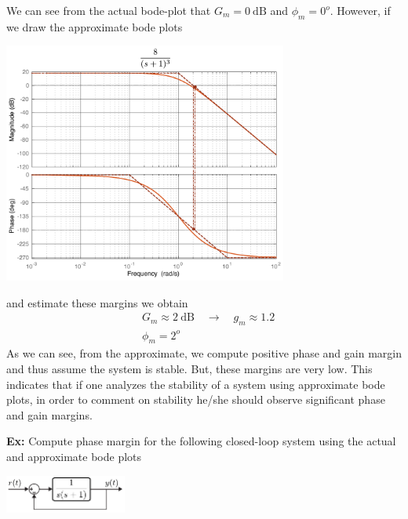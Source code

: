 \documentclass[twoside]{article}
\begin{document}
We can see from the actual bode-plot that  $G_m =  0 \ \mathrm{dB}$
and $\phi_m = 0^o$.
However, if we draw the approximate bode plots 

\begin{center}
\begin{minipage}[h]{\linewidth}
    \begin{center}
      \includegraphics[width=0.7\textwidth]{margin3}
    \end{center}
\end{minipage}
\end{center}

and estimate these margins we obtain
%
\begin{align*}
	&G_m \approx 2 \ \mathrm{dB} \quad \rightarrow \quad g_m \approx 1.2	
	\\
	&\phi_m = 2^o
\end{align*}
%
As we can see, from the approximate, we compute positive
phase and gain margin and thus assume the system is stable.
But, these margins are very low. This indicates that if one 
analyzes the stability of a system using approximate
bode plots, in order to comment on stability he/she should
observe significant phase and gain margins.


\textbf{Ex:} Compute  phase margin for the following closed-loop system 
using the actual and approximate bode plots

\begin{center}
\begin{minipage}[h]{\linewidth}
    \begin{center}
      \includegraphics[width=0.3\textwidth]{ex4block}
    \end{center}
\end{minipage}
\end{center}
\end{document}

